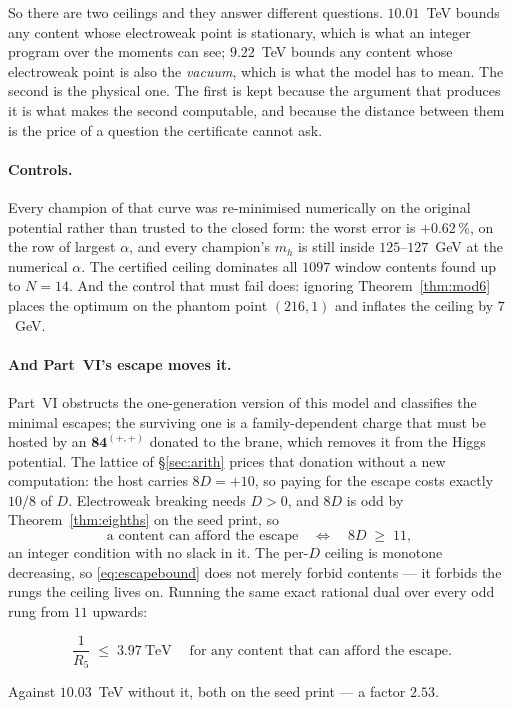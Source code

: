 \documentclass[11pt,a4paper]{article}
\newcommand{\rep}[1]{\mathbf{#1}}
\newenvironment{keyeq}
  {\begin{center}\setlength{\fboxsep}{9pt}\setlength{\fboxrule}{0.8pt}%
   \begin{lrbox}{\keyeqbox}\begin{minipage}{0.88\textwidth}}
  {\end{minipage}\end{lrbox}%
   \fcolorbox{hdrblue!55}{hdrblue!6}{\usebox{\keyeqbox}}\end{center}}
\begin{document}
So there are two ceilings and they answer different questions. $10.01$~TeV bounds any content whose
electroweak point is stationary, which is what an integer program over the moments can see;
$9.22$~TeV bounds any content whose electroweak point is also the \emph{vacuum}, which is what the
model has to mean. The second is the physical one. The first is kept because the argument that
produces it is what makes the second computable, and because the distance between them is the
price of a question the certificate cannot ask.

\paragraph{Controls.} Every champion of that curve was re-minimised numerically on the original
potential rather than trusted to the closed form: the worst error is $+0.62\,\%$, on the row of
largest $\alpha$, and every champion's $m_h$ is still inside $125$--$127$~GeV at the numerical
$\alpha$. The certified ceiling dominates all $1097$ window contents found up to $N=14$. And the
control that must fail does: ignoring Theorem~\ref{thm:mod6} places the optimum on the phantom point
$(216,1)$ and inflates the ceiling by $7$~GeV.

\paragraph{And Part~VI's escape moves it.} Part~VI \cite{PartVI} obstructs the one-generation
version of this model and classifies the minimal escapes; the surviving one is a family-dependent
charge that must be hosted by an $\rep{84}^{(+,+)}$ donated to the brane, which removes it from the
Higgs potential. The lattice of \S\ref{sec:arith} prices that donation without a new computation:
the host carries $8D=+10$, so paying for the escape costs exactly $10/8$ of $D$.
Electroweak breaking needs $D>0$, and $8D$ is odd by Theorem~\ref{thm:eighths} on the seed
\cite{KM25} print, so
\begin{equation}\label{eq:escapebound}
  \text{a content can afford the escape}\quad\Longleftrightarrow\quad 8D\;\ge\;11 ,
\end{equation}
an integer condition with no slack in it. The per-$D$ ceiling is monotone
decreasing, so \eqref{eq:escapebound} does not merely forbid contents --- it forbids the rungs the
ceiling lives on. Running the same exact rational dual over every odd rung from $11$ upwards:
\begin{keyeq}
\begin{equation}\label{eq:escapeceiling}
  \boxed{\;\frac{1}{R_5}\;\le\;3.97\ \text{TeV}\;}
  \quad\text{for any content that can afford the escape.}
\end{equation}
\end{keyeq}
\noindent Against $10.03$~TeV without it, both on the seed \cite{KM25} print --- a factor $2.53$.
\end{document}
